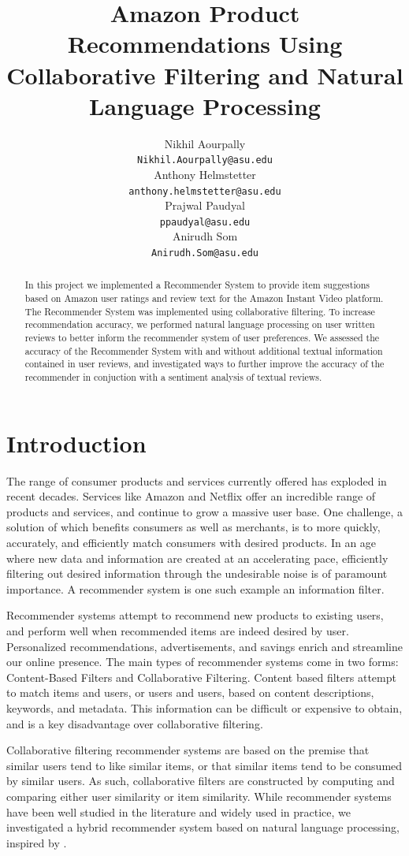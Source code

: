 \documentclass{article} %
\title{Amazon Product Recommendations Using Collaborative Filtering and Natural Language Processing  }
\author{
Nikhil Aourpally \\
\texttt{Nikhil.Aourpally@asu.edu} \\
\And
Anthony Helmstetter \\
\texttt{anthony.helmstetter@asu.edu} \\
\And
Prajwal Paudyal \\
\texttt{ppaudyal@asu.edu} \\
\And
Anirudh Som \\
\texttt{Anirudh.Som@asu.edu} \\
}
\begin{document}
\maketitle

\begin{abstract}
In this project we implemented a Recommender System to provide item suggestions based on Amazon user ratings and review text for the Amazon Instant Video platform. The Recommender System was implemented using collaborative filtering. To increase recommendation accuracy, we performed natural language processing on user written reviews to better inform the recommender system of user preferences. We assessed the accuracy of the Recommender System with and without additional textual information contained in user reviews, and investigated ways to further improve the accuracy of the recommender in conjuction with a sentiment analysis of textual reviews. 
\end{abstract}


\section{Introduction}
The range of consumer products and services currently offered has exploded in recent decades. Services like Amazon and Netflix offer an incredible range of products and services, and continue to grow a massive user base. One challenge, a solution of which benefits consumers as well as merchants, is to more quickly, accurately, and efficiently match consumers with desired products. In an age where new data and information are created at an accelerating pace, efficiently filtering out desired information through the undesirable noise is of paramount importance. A recommender system is one such example an information filter. 

Recommender systems attempt to recommend new products to existing users, and perform well when recommended items are indeed desired by user. Personalized recommendations, advertisements, and savings enrich and streamline our online presence.  The main types of recommender systems come in two forms: Content-Based Filters and Collaborative Filtering. Content based filters attempt to match items and users, or users and users, based on content descriptions, keywords, and metadata. This information can be difficult or expensive to obtain, and is a key disadvantage over collaborative filtering. 

Collaborative filtering recommender systems are based on the premise that similar users tend to like similar items, or that similar items tend to be consumed by similar users. As such, collaborative filters are constructed by computing and comparing either user similarity or item similarity. While recommender systems have been well studied in the literature and widely used in practice, we investigated a hybrid recommender system based on natural language processing, inspired by \cite{RecSys}. 
\end{document}

